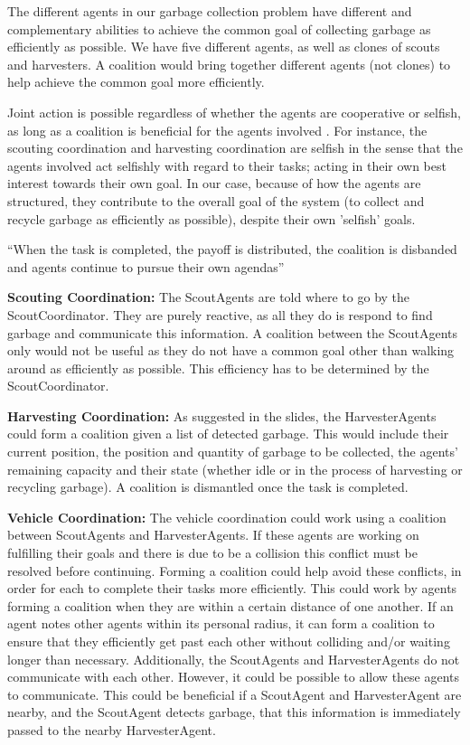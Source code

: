 The different agents in our garbage collection problem have different and complementary abilities to achieve the common goal of collecting garbage as efficiently as possible. We have five different agents, as well as clones of scouts and harvesters. A coalition would bring together different agents (not clones) to help achieve the common goal more efficiently.
 
Joint action is possible regardless of whether the agents are cooperative or selfish, as long as a coalition is beneficial for the agents involved \cite{Rahwan:2015}.  For instance, the scouting coordination and harvesting coordination are selfish in the sense that the agents involved act selfishly with regard to their tasks; acting in their own best interest towards their own goal. In our case, because of how the agents are structured, they contribute to the overall goal of the system (to collect and recycle garbage as efficiently as possible), despite their own 'selfish' goals.
 
``When the task is completed, the payoff is distributed, the coalition is disbanded and agents continue to pursue their own agendas'' \cite{Shehory}

\textbf{Scouting Coordination:} The ScoutAgents are told where to go by the ScoutCoordinator. They are purely reactive, as all they do is respond to find garbage and communicate this information. A coalition between the ScoutAgents only would not be useful as they do not have a common goal other than walking around as efficiently as possible. This efficiency has to be determined by the ScoutCoordinator.  

\textbf{Harvesting Coordination:} As suggested in the slides, the HarvesterAgents could form a coalition given a list of detected garbage. This would include their current position, the position and quantity of garbage to be collected, the agents' remaining capacity and their state (whether idle or in the process of harvesting or recycling garbage). A coalition is dismantled once the task is completed.

\textbf{Vehicle Coordination:} The vehicle coordination could work using a coalition between ScoutAgents and HarvesterAgents. If these agents are working on fulfilling their goals and there is due to be a collision this conflict must be resolved before continuing. Forming a coalition could help avoid these conflicts, in order for each to complete their tasks more efficiently. This could work by agents forming a coalition when they are within a certain distance of one another. If an agent notes other agents within its personal radius, it can form a coalition to ensure that they efficiently get past each other without colliding and/or waiting longer than necessary. Additionally, the ScoutAgents and HarvesterAgents do not communicate with each other. However, it could be possible to allow these agents to communicate. This could be beneficial if a ScoutAgent and HarvesterAgent are nearby, and the ScoutAgent detects garbage, that this information is immediately passed to the nearby HarvesterAgent. 

